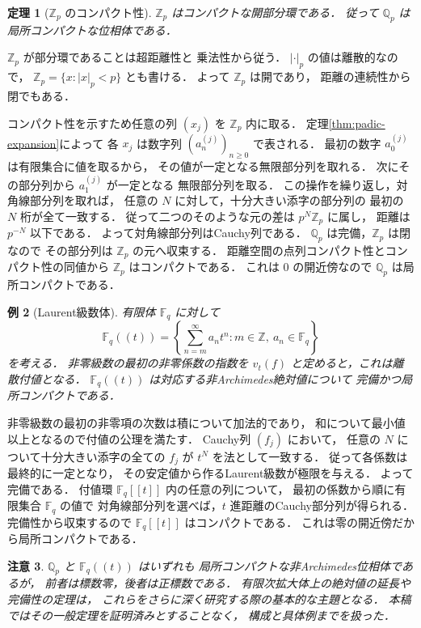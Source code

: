 \documentclass[a5paper,10pt,onecolumn]{jsarticle}
\makeatletter
\theoremstyle{mathnotetheorem}
\newtheorem{theorem}{定理}[section]
\newtheorem{example}[theorem]{例}
\newtheorem{remark}[theorem]{注意}
\renewcommand{\proofname}{証明}
\renewenvironment{proof}[1][\proofname]{%
  \par\pushQED{\qed}\normalfont\topsep4\p@\@plus2\p@\relax
  \trivlist\item[\hskip\labelsep\bfseries #1]\ignorespaces
}{\popQED\endtrivlist\@endpefalse}
\makeatother
\begin{document}
\begin{theorem}[$\mathbb Z_p$ のコンパクト性]\label{thm:zp-compact}
$\mathbb Z_p$ はコンパクトな開部分環である．
従って $\mathbb Q_p$ は局所コンパクトな位相体である．
\end{theorem}
\begin{proof}
$\mathbb Z_p$ が部分環であることは超距離性と
乗法性から従う．
$|\cdot|_p$ の値は離散的なので，
$\mathbb Z_p=\{x:|x|_p<p\}$ とも書ける．
よって $\mathbb Z_p$ は開であり，
距離の連続性から閉でもある．

コンパクト性を示すため任意の列 $(x_j)$ を
$\mathbb Z_p$ 内に取る．
定理\ref{thm:padic-expansion}によって
各 $x_j$ は数字列 $(a_n^{(j)})_{n\ge0}$ で表される．
最初の数字 $a_0^{(j)}$ は有限集合に値を取るから，
その値が一定となる無限部分列を取れる．
次にその部分列から $a_1^{(j)}$ が一定となる
無限部分列を取る．
この操作を繰り返し，対角線部分列を取れば，
任意の $N$ に対して，十分大きい添字の部分列の
最初の $N$ 桁が全て一致する．
従って二つのそのような元の差は
$p^N\mathbb Z_p$ に属し，
距離は $p^{-N}$ 以下である．
よって対角線部分列はCauchy列である．
$\mathbb Q_p$ は完備，$\mathbb Z_p$ は閉なので
その部分列は $\mathbb Z_p$ の元へ収束する．
距離空間の点列コンパクト性とコンパクト性の同値から
$\mathbb Z_p$ はコンパクトである．
これは $0$ の開近傍なので $\mathbb Q_p$ は局所コンパクトである．
\end{proof}

\begin{example}[Laurent級数体]
有限体 $\mathbb F_q$ に対して
\[
 \mathbb F_q((t))
 =\left\{\sum_{n=m}^\infty a_nt^n:
 m\in\mathbb Z,\ a_n\in\mathbb F_q\right\}
\]
を考える．
非零級数の最初の非零係数の指数を
$v_t(f)$ と定めると，これは離散付値となる．
$\mathbb F_q((t))$ は対応する非Archimedes絶対値について
完備かつ局所コンパクトである．
\end{example}
\begin{proof}
非零級数の最初の非零項の次数は積について加法的であり，
和について最小値以上となるので付値の公理を満たす．
Cauchy列 $(f_j)$ において，
任意の $N$ について十分大きい添字の全ての $f_j$ が
$t^N$ を法として一致する．
従って各係数は最終的に一定となり，
その安定値から作るLaurent級数が極限を与える．
よって完備である．
付値環 $\mathbb F_q[[t]]$ 内の任意の列について，
最初の係数から順に有限集合 $\mathbb F_q$ の値で
対角線部分列を選べば，$t$ 進距離のCauchy部分列が得られる．
完備性から収束するので
$\mathbb F_q[[t]]$ はコンパクトである．
これは零の開近傍だから局所コンパクトである．
\end{proof}

\begin{remark}
$\mathbb Q_p$ と $\mathbb F_q((t))$ はいずれも
局所コンパクトな非Archimedes位相体であるが，
前者は標数零，後者は正標数である．
有限次拡大体上の絶対値の延長や完備性の定理は，
これらをさらに深く研究する際の基本的な主題となる．
本稿ではその一般定理を証明済みとすることなく，
構成と具体例までを扱った．
\end{remark}
\end{document}
